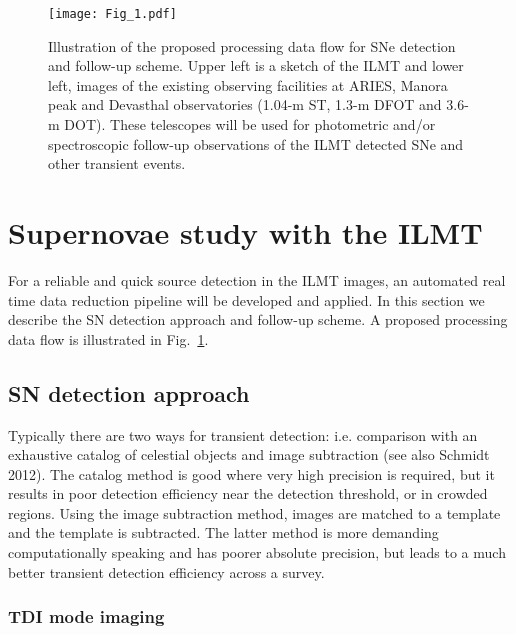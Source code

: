 \documentclass[12pt,a4paper]{article}
\begin{document}
\begin{figure}[ht]
\centering
\texttt{[image: Fig\_1.pdf]}
\caption{Illustration of the proposed processing data flow for SNe detection and
follow-up scheme. Upper left is a sketch of the ILMT and
lower left, images of the existing observing facilities at ARIES, Manora peak and
Devasthal observatories (1.04-m ST, 1.3-m DFOT and 3.6-m DOT).
These telescopes will be used for photometric and/or spectroscopic follow-up 
observations of the ILMT detected SNe and other transient events.}
\label{ilmt_im_sub}
\end{figure}

\section{Supernovae study with the ILMT}

For a reliable and quick source detection in the ILMT images, an automated real time data reduction
pipeline will be developed and applied. In this section we describe the SN detection approach and 
follow-up scheme. A proposed processing data flow is illustrated in Fig.~\ref{ilmt_im_sub}.

\subsection{SN detection approach}

Typically there are two ways for transient detection: i.e. comparison with an exhaustive 
catalog of celestial objects and image subtraction (see also Schmidt 2012). The catalog method
is good where very high precision is required, but it results in poor detection
efficiency near the detection threshold, or in crowded regions. Using the image
subtraction method, images are matched to a template and the template is subtracted.
The latter method is more demanding computationally speaking and has poorer absolute precision,
but leads to a much better transient detection efficiency across a survey.

\subsubsection{TDI mode imaging} \label{tdi}
\end{document}
